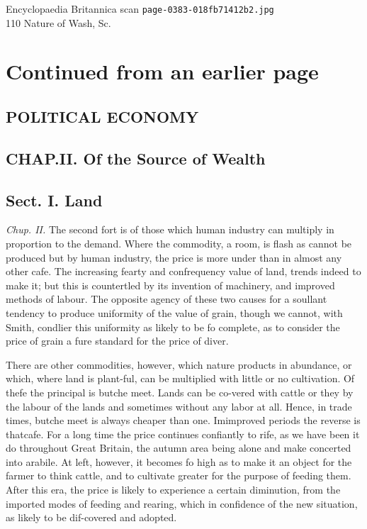 \documentclass{article}
\begin{document}
\begin{center}
{\Large Encyclopaedia Britannica scan \texttt{page-0383-018fb71412b2.jpg}}\\[0.5em]
110 Nature of Wash, Sc.
\end{center}
\section*{Continued from an earlier page}
\subsection*{POLITICAL ECONOMY}
\subsection*{CHAP.II. Of the Source of Wealth}
\subsection*{Sect. I. Land}
\textit{Chup. II.}
The second fort is of those which human industry can multiply in proportion to the demand. Where the commodity, a room, is flash as cannot be produced but by human industry, the price is more under than in almost any other cafe. The increasing fearty and confrequency value of land, trends indeed to make it; but this is countertled by its invention of machinery, and improved methods of labour. The opposite agency of these two causes for a soullant tendency to produce uniformity of the value of grain, though we cannot, with Smith, condlier this uniformity as likely to be fo complete, as to consider the price of grain a fure standard for the price of diver.

There are other commodities, however, which nature products in abundance, or which, where land is plant-ful, can be multiplied with little or no cultivation. Of thefe the principal is butche meet. Lands can be co-vered with cattle or they by the labour of the lands and sometimes without any labor at all. Hence, in trade times, butche meet is always cheaper than one. Imimproved periods the reverse is thatcafe. For a long time the price continues confiantly to rife, as we have been it do throughout Great Britain, the autumn area being alone and make concerted into arabile. At left, however, it becomes fo high as to make it an object for the farmer to think cattle, and to cultivate greater for the purpose of feeding them. After this era, the price is likely to experience a certain diminution, from the imported modes of feeding and rearing, which in confidence of the new situation, as likely to be dif-covered and adopted.
\end{document}
